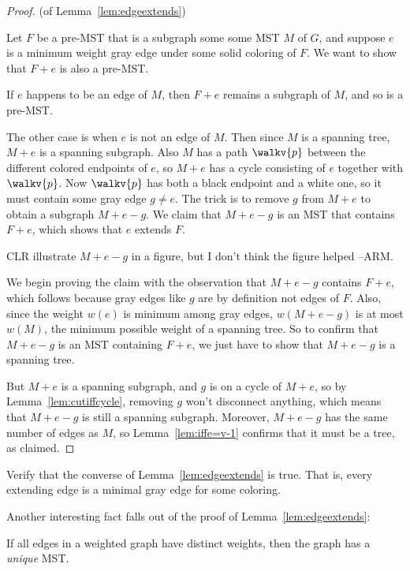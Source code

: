 \begin{proof} (of Lemma~\ref{lem:edgeextends})

  Let $F$ be a pre-MST that is a subgraph some some MST $M$ of $G$, and
  suppose $e$ is a minimum weight gray edge under some solid coloring of
  $F$.  We want to show that $F+e$ is also a pre-MST.

  If $e$ happens to be an edge of $M$, then $F+e$ remains a subgraph of
  $M$, and so is a pre-MST.

  The other case is when $e$ is not an edge of $M$.  Then since $M$ is a
  spanning tree, $M+e$ is a spanning subgraph.  Also $M$ has a path
  $\walkv{p}$ between the different colored endpoints of $e$, so $M+e$ has
  a cycle consisting of $e$ together with $\walkv{p}$.  Now $\walkv{p}$ has
  both a black endpoint and a white one, so it must contain some gray edge
  $g \neq e$.  The trick is to remove $g$ from $M+e$ to obtain a subgraph
  $M+e-g$.  We claim that $M+e-g$ is an MST that contains $F+e$, which
  shows that $e$ extends $F$.

\begin{editingnotes}
  CLR illustrate $M+e-g$ in a figure, but I don't think the figure helped
  --ARM.
\end{editingnotes}

We begin proving the claim with the observation that $M+e-g$ contains
$F+e$, which follows because gray edges like $g$ are by definition not
edges of $F$.  Also, since the weight $w(e)$ is minimum among gray edges,
$w(M+e-g)$ is at most $w(M)$, the minimum possible weight of a spanning
tree.  So to confirm that $M+e-g$ is an MST containing $F+e$, we just have
to show that $M+e-g$ is a spanning tree.

But $M+e$ is a spanning subgraph, and $g$ is on a cycle of $M+e$, so by
Lemma~\ref{lem:cutiffcycle}, removing $g$ won't disconnect anything, which
means that $M+e-g$ is still a spanning subgraph.  Moreover, $M+e-g$ has
the same number of edges as $M$, so Lemma~\ref{lem:iffe=v-1} confirms that it
must be a tree, as claimed.

\end{proof}

\begin{editingnotes}
  Verify that the converse of Lemma~\ref{lem:edgeextends} is true.
  That is, every extending edge is a minimal gray edge for some
  coloring.
\end{editingnotes}

Another interesting fact falls out of the proof of Lemma~\ref{lem:edgeextends}:
\begin{corollary}\label{cor:uniqMST}
If all edges in a weighted graph have distinct weights, then the graph has
a \emph{unique} MST.
\end{corollary}

